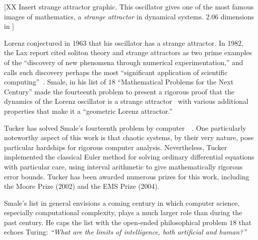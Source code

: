 \documentclass{llncs}
\begin{document}


% 

[XX Insert strange attractor graphic. This oscillator gives one of the
most famous images of mathematics, a {\it strange attractor} in
dynamical systems.  2.06 dimensions in ]


Lorenz conjectured in 1963 that his oscillator has a strange
attractor.  In 1982, the Lax report cited soliton theory and strange
attractors as two prime examples of the ``discovery of new phenomena
through numerical experimentation,'' and calls such discovery perhaps the most
``significant application of scientific computing''~\cite{Lax}.
Smale, in his list of $18$ ``Mathematical Problems for the Next
Century'' made the fourteenth problem to present a rigorous proof that
the dynamics of the Lorenz oscillator is a strange
attractor~\cite{Sma98} with various additional properties that make it a
``geometric Lorenz attractor.''

Tucker has solved Smale's fourteenth problem by
computer~\cite{Tuc02}~\cite{St00}.  One particularly noteworthy aspect
of this work is that chaotic systems, by their very nature, pose
particular hardships for rigorous computer analysis.  Nevertheless,
Tucker implemented the classical Euler method for solving ordinary
differential equations with particular care,  using interval
arithmetic to give mathematically rigorous error bounds.  Tucker has
been awarded numerous prizes for this work, including the Moore Prize
(2002) and the EMS Prize (2004).

Smale's list in general envisions a coming century in which computer
science, especially computational complexity, plays a much larger
role than during the past century. He caps the list with the
open-ended philosophical problem $18$ that echoes Turing: {\it
  ``What are the limits of intelligence, both artificial and human?''}
\end{document}

